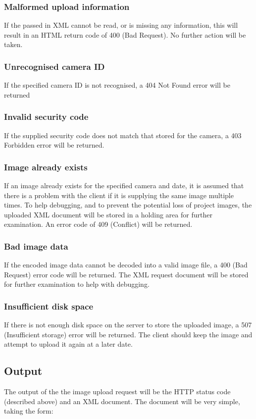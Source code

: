\documentclass[11pt]{article}
\begin{document}
\subsubsection{Malformed upload information}
If the passed in XML cannot be read, or is missing any information, this will result in an HTML return code of 400 (Bad Request). No further action will be taken.

\subsubsection{Unrecognised camera ID}
If the specified camera ID is not recognised, a 404 Not Found error will be returned

\subsubsection{Invalid security code}
If the supplied security code does not match that stored for the camera, a 403 Forbidden error will be returned.

\subsubsection{Image already exists}
If an image already exists for the specified camera and date, it is assumed that there is a problem with the client if it is supplying the same image multiple times. To help debugging, and to prevent the potential loss of project images, the uploaded XML document will be stored in a holding area for further examination. An error code of 409 (Conflict) will be returned.

\subsubsection{Bad image data}
If the encoded image data cannot be decoded into a valid image file, a 400 (Bad Request) error code will be returned. The XML request document will be stored for further examination to help with debugging.

\subsubsection{Insufficient disk space}
If there is not enough disk space on the server to store the uploaded image, a 507 (Insufficient storage) error will be returned. The client should keep the image and attempt to upload it again at a later date.

\subsection{Output}
The output of the the image upload request will be the HTTP status code (described above) and an XML document. The document will be very simple, taking the form:
\end{document}

